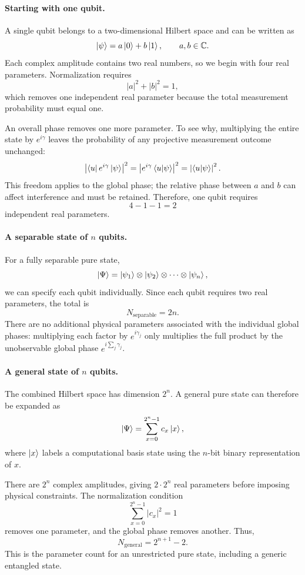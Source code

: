 \documentclass[11pt]{article}
\begin{document}
\paragraph{Starting with one qubit.}
A single qubit belongs to a two-dimensional Hilbert space and
can be written as
\[
\ket{\psi}=a\ket{0}+b\ket{1},
\qquad a,b\in\mathbb{C}.
\]
Each complex amplitude contains two real numbers, so we begin
with four real parameters. Normalization requires
\[
|a|^2+|b|^2=1,
\]
which removes one independent real parameter because the total
measurement probability must equal one.

An overall phase removes one more parameter. To see why,
multiplying the entire state by $e^{i\gamma}$ leaves the
probability of any projective measurement outcome unchanged:
\[
\left|\bra{u}e^{i\gamma}\ket{\psi}\right|^2
=
\left|e^{i\gamma}\braket{u|\psi}\right|^2
=
\left|\braket{u|\psi}\right|^2.
\]
This freedom applies to the global phase; the relative phase
between $a$ and $b$ can affect interference and must be retained.
Therefore, one qubit requires
\[
4-1-1=2
\]
independent real parameters.

\paragraph{A separable state of $n$ qubits.}
For a fully separable pure state,
\[
\ket{\Psi}
=
\ket{\psi_1}\otimes\ket{\psi_2}\otimes\cdots
\otimes\ket{\psi_n},
\]
we can specify each qubit individually. Since each qubit
requires two real parameters, the total is
\[
\boxed{N_{\mathrm{separable}}=2n.}
\]
There are no additional physical parameters associated with
the individual global phases: multiplying each factor by
$e^{i\gamma_j}$ only multiplies the full product by the
unobservable global phase $e^{i\sum_j\gamma_j}$.

\paragraph{A general state of $n$ qubits.}
The combined Hilbert space has dimension $2^n$. A general
pure state can therefore be expanded as
\[
\ket{\Psi}
=
\sum_{x=0}^{2^n-1}c_x\ket{x},
\]
where $\ket{x}$ labels a computational basis state using
the $n$-bit binary representation of $x$.

There are $2^n$ complex amplitudes, giving $2\cdot 2^n$
real parameters before imposing physical constraints.
The normalization condition
\[
\sum_{x=0}^{2^n-1}|c_x|^2=1
\]
removes one parameter, and the global phase removes another.
Thus,
\[
\boxed{N_{\mathrm{general}}=2^{n+1}-2.}
\]
This is the parameter count for an unrestricted pure state,
including a generic entangled state. 
\end{document}
